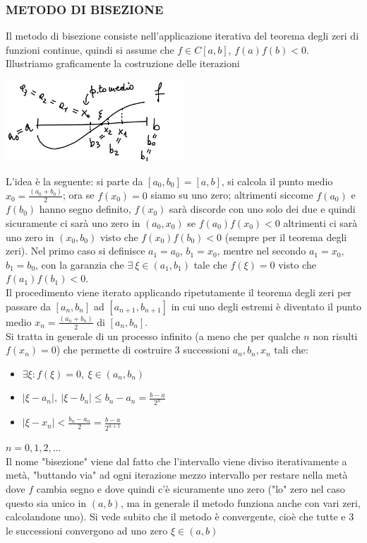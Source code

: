 \documentclass[12pt]{article}
\begin{document}
\subsubsection*{METODO DI BISEZIONE}
Il metodo di bisezione consiste nell'applicazione iterativa del teorema degli zeri di funzioni continue, quindi si assume che $f \in C[a,b]$, $f(a)f(b)<0$. \\
Illustriamo graficamente la costruzione delle iterazioni
\begin{center}
            \includegraphics[width=0.5\textwidth]{im_pag10.png}\par
\end{center}
L'idea è la seguente: si parte da $[a_0,b_0]=[a,b]$, si calcola il punto medio $x_0=\frac{(a_0+b_0)}{2}$; ora se $f(x_0)=0$ siamo su uno zero; altrimenti siccome $f(a_0)$ e $f(b_0)$ hanno segno definito, $f(x_0)$ sarà discorde con uno solo dei due e quindi sicuramente ci sarà uno zero in $(a_0,x_0)$ se $f(a_0)f(x_0)<0$ altrimenti ci sarà uno zero in $(x_0, b_0)$ visto che $f(x_0)f(b_0)<0$ (sempre per il teorema degli zeri). Nel primo caso si definisce $a_1=a_0$, $b_1=x_0$, mentre nel secondo $a_1=x_0$, $b_1=b_0$, con la garanzia che $\exists \ \xi \in (a_1,b_1)$ tale che $f(\xi)=0$ visto che $f(a_1)f(b_1)<0$.\\
Il procedimento viene iterato applicando ripetutamente il teorema degli zeri per passare da $[a_n,b_n]$ ad $[a_{n+1},b_{n+1}]$ in cui uno degli estremi è diventato il punto medio $x_n=\frac{(a_n+b_n)}{2}$ di $[a_n,b_n]$.\\
Si tratta in generale di un processo infinito (a meno che per qualche $n$ non risulti $f(x_n)=0$) che permette di costruire 3 successioni ${ a_n } , { b_n } , { x_n } $ tali che:
\begin{itemize}
    \item $\exists \xi : f(\xi)=0, \ \xi \in (a_n,b_n)$
    \item $|\xi - a_n|, \ |\xi - b_n| \leq b_n-a_n=\frac{b-a}{2^n}$
    \item $|\xi - x_n| < \frac{b_n - a_n}{2} = \frac{b-a}{2^{n+1}}$
\end{itemize}
$n=0,1,2,\dots$ \\
Il nome "bisezione" viene dal fatto che l'intervallo viene diviso iterativamente a metà, "buttando via" ad ogni iterazione mezzo intervallo per restare nella metà dove $f$ cambia segno e dove quindi c'è sicuramente uno zero ("lo" zero nel caso questo sia unico in $(a,b)$, ma in generale il metodo funziona anche con vari zeri, calcolandone uno). Si vede subito che il metodo è convergente, cioè che tutte e 3 le successioni convergono ad uno zero $\xi \in (a,b)$
\end{document}
